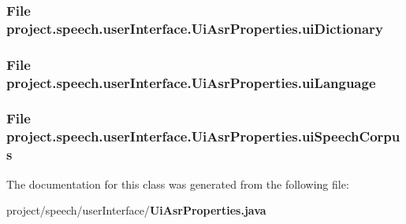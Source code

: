 \subsubsection[{ui\+Dictionary}]{\setlength{\rightskip}{0pt plus 5cm}File project.\+speech.\+user\+Interface.\+Ui\+Asr\+Properties.\+ui\+Dictionary\hspace{0.3cm}{\ttfamily [private]}}\label{classproject_1_1speech_1_1user_interface_1_1_ui_asr_properties_a145d6c60adf65497a8ee44cdecc76993}
\subsubsection[{ui\+Language}]{\setlength{\rightskip}{0pt plus 5cm}File project.\+speech.\+user\+Interface.\+Ui\+Asr\+Properties.\+ui\+Language\hspace{0.3cm}{\ttfamily [private]}}\label{classproject_1_1speech_1_1user_interface_1_1_ui_asr_properties_ad891b8ede2e34cc669acf75848720aa4}
\subsubsection[{ui\+Speech\+Corpus}]{\setlength{\rightskip}{0pt plus 5cm}File project.\+speech.\+user\+Interface.\+Ui\+Asr\+Properties.\+ui\+Speech\+Corpus\hspace{0.3cm}{\ttfamily [private]}}\label{classproject_1_1speech_1_1user_interface_1_1_ui_asr_properties_aa121a276dc88a5fe3e7b5edc4f1eea95}


The documentation for this class was generated from the following file\+:\begin{DoxyCompactItemize}
\item 
project/speech/user\+Interface/{\bf Ui\+Asr\+Properties.\+java}\end{DoxyCompactItemize}
